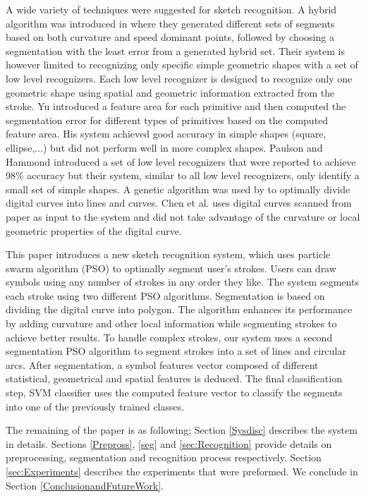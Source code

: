 \documentclass{article}
\begin{document}
A wide variety of techniques were suggested for sketch recognition.  A hybrid algorithm was introduced in \cite{earlyprocess} where they generated different sets of segments based on both curvature and speed dominant points, followed by choosing a segmentation with the least error from a generated hybrid set. Their system is however limited to recognizing only specific simple geometric shapes with a set of low level recognizers. Each low level recognizer is designed to recognize only one geometric shape using spatial and geometric information extracted from the stroke.  Yu \cite{meanshift10}introduced a feature area for each primitive and then computed the segmentation error for different types of primitives based on the computed feature area. His system achieved good accuracy in simple shapes (square, ellipse,...) but did not perform well in more complex shapes. Paulson and Hammond\cite{Paleosketch08} introduced a set of low level recognizers that were reported to achieve 98\%  accuracy but their system, similar to all low level recognizers, only identify a small set of simple shapes. A genetic algorithm was used by \cite{CruveDivisionSwarm} to optimally divide digital curves into lines and curves. Chen et al.\cite{CruveDivisionSwarm} uses digital curves scanned from paper as input to the system and did not take advantage of the curvature or local geometric properties of the digital curve.

This paper introduces a new sketch recognition system, which uses particle swarm algorithm (PSO) to optimally segment user's strokes. Users can draw symbols using any number of strokes in any order they like. The system segments each stroke using two different PSO algorithms. Segmentation is based on dividing the digital curve into polygon\cite{PolygonApproximationPSO}. The algorithm enhances its performance by adding curvature and other local information while segmenting strokes to achieve better results. To handle complex strokes, our system uses a second segmentation PSO algorithm to segment strokes into a set of lines and circular arcs. After segmentation, a symbol features vector composed of different statistical, geometrical and spatial features is deduced. The final classification step, SVM classifier uses the computed feature vector to classify the segments into one of the previously trained classes.

 The remaining of the paper is as following; Section \ref{Sysdisc} describes the system in details.  Sections \ref{Prepross}, \ref{seg} and \ref{sec:Recognition} provide details on preprocessing, segmentation and recognition process respectively. Section \ref{sec:Experiments} describes the experiments that were preformed. We conclude in Section \ref{ConclusionandFutureWork}.
\end{document}
